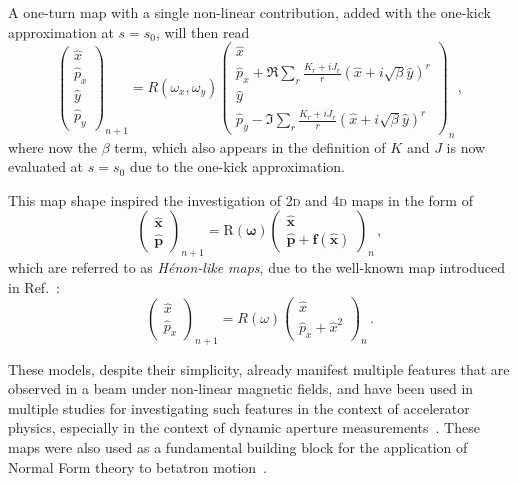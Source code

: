 A one-turn map with a single non-linear contribution, added 
with the one-kick approximation at $s = s_0$, will then read  
\begin{equation}
	\begin{pmatrix}
		\hat x \\ \hat p_x \\ \hat y \\ \hat p_y 
	\end{pmatrix}_{n+1}
	=
	R(\omega_x,\omega_y)
	\begin{pmatrix}
		\hat x \\ \hat p_x + \Re \sum_r\frac{K_r + iJ_r}{r}(\hat x+ i\sqrt{\beta}\hat y)^r \\ \hat y \\ \hat p_y - \Im \sum_r\frac{K_r + iJ_r}{r}(\hat x+ i\sqrt{\beta}\hat y)^r  
	\end{pmatrix}_{n}\,,
\end{equation}
where now the $\beta$ term, which also appears in the definition of $K$ and $J$ is now evaluated at $s=s_0$ due to the one-kick approximation.

This map shape inspired the investigation of 2\textsc{d} and 4\textsc{d} maps in the form of
\begin{equation}
	\begin{pmatrix}
		\hat{\mathbf{x}} \\ \hat{\mathbf{p}}  
	\end{pmatrix}_{n+1}
	=
	\mathrm{R}(\bm\omega)
		\begin{pmatrix}
			\hat{\mathbf{x}} \\ \hat{\mathbf{p}} + \mathbf{f}(\hat{\mathbf{x}})
	\end{pmatrix}_{n} \,,
	\label{eq:henonlike}
\end{equation}
which are referred to as \textit{Hénon-like maps}, due to the well-known map introduced in Ref.~\cite{henon}:
%
\begin{equation}
	\begin{pmatrix}
		\hat x \\ \hat p_x
	\end{pmatrix}_{n+1}
	=
	R(\omega)
		\begin{pmatrix}
			\hat x \\ \hat p_x + \hat x^2
	\end{pmatrix}_{n} \,.
	\label{eq:simplehenon}
\end{equation}

These models, despite their simplicity, already manifest multiple features that are observed in a beam under non-linear magnetic fields, and have been used in multiple studies for investigating such features in the context of accelerator physics, especially in the context of dynamic aperture measurements~\cite{}. These maps were also used as a fundamental building block for the application of Normal Form theory to betatron motion~\cite{}.

